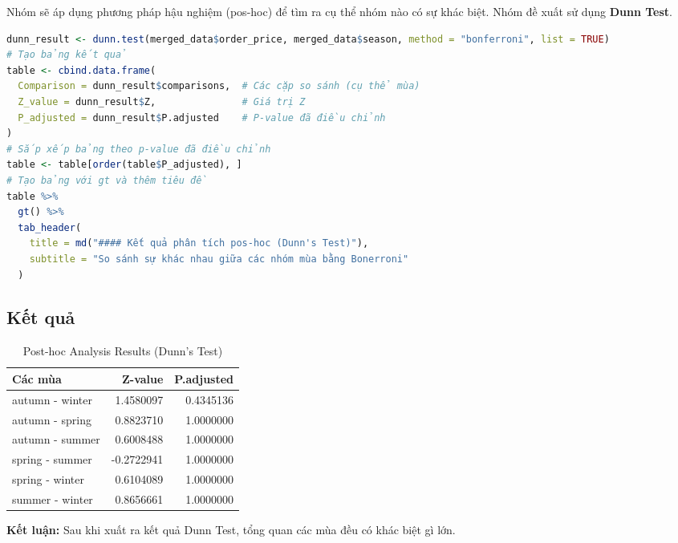 \noindent Nhóm sẽ áp dụng phương pháp hậu nghiệm (pos-hoc) để tìm ra cụ thể nhóm nào có sự khác biệt. Nhóm đề xuất sử dụng \textbf{Dunn Test}.

\begin{lstlisting}[language=R,caption=Thực hiện phân tích Pos Hoc trong R]
dunn_result <- dunn.test(merged_data$order_price, merged_data$season, method = "bonferroni", list = TRUE)
# Tạo bảng kết quả
table <- cbind.data.frame(
  Comparison = dunn_result$comparisons,  # Các cặp so sánh (cụ thể mùa)
  Z_value = dunn_result$Z,               # Giá trị Z
  P_adjusted = dunn_result$P.adjusted    # P-value đã điều chỉnh
)
# Sắp xếp bảng theo p-value đã điều chỉnh
table <- table[order(table$P_adjusted), ]
# Tạo bảng với gt và thêm tiêu đề
table %>%
  gt() %>%
  tab_header(
    title = md("#### Kết quả phân tích pos-hoc (Dunn's Test)"),
    subtitle = "So sánh sự khác nhau giữa các nhóm mùa bằng Bonerroni"
  )

\end{lstlisting}
\subsection{Kết quả}

\begin{table}[H]
\centering
\begin{tabular}{|l|r|r|} %
\hline
\textbf{Các mùa} & \textbf{Z-value} & \textbf{P.adjusted} \\ \hline
autumn - winter     & 1.4580097        & 0.4345136           \\ \hline
autumn - spring     & 0.8823710        & 1.0000000           \\ \hline
autumn - summer     & 0.6008488        & 1.0000000           \\ \hline
spring - summer     & -0.2722941       & 1.0000000           \\ \hline
spring - winter     & 0.6104089        & 1.0000000           \\ \hline
summer - winter     & 0.8656661        & 1.0000000           \\ \hline
\end{tabular}
\caption{Post-hoc Analysis Results (Dunn's Test)}
\label{tab:dunn_results}
\end{table}

    \textbf{Kết luận:}
    Sau khi xuất ra kết quả Dunn Test, tổng quan các mùa đều có khác biệt gì lớn.
